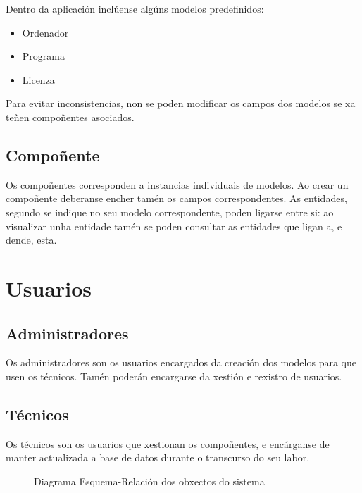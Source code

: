 \newpage

Dentro da aplicación inclúense algúns modelos predefinidos:

\begin{itemize}
    \item Ordenador
    \item Programa
    \item Licenza
\end{itemize}

Para evitar inconsistencias, non se poden modificar os campos dos modelos se xa teñen compoñentes asociados.

\subsection{Compoñente}

Os compoñentes corresponden a instancias individuais de modelos. Ao crear un compoñente deberanse encher tamén os campos correspondentes. As entidades, segundo se indique no seu modelo correspondente, poden ligarse entre si: ao visualizar unha entidade tamén se poden consultar as entidades que ligan a, e dende, esta.

\section{Usuarios}
\label{sec:usuarios}

\subsection{Administradores}

Os administradores son os usuarios encargados da creación dos modelos para que usen os técnicos. Tamén poderán encargarse da xestión e rexistro de usuarios.

\subsection{Técnicos}

Os técnicos son os usuarios que xestionan os compoñentes, e encárganse de manter actualizada a base de datos durante o transcurso do seu labor.


\begin{figure}
    \centering
    \resizebox{.8\linewidth}{!}{}
    \caption{Diagrama Esquema-Relación dos obxectos do sistema}
    \label{fig:erobxectos}
\end{figure}

